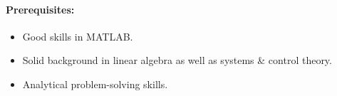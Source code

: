 \documentclass[a4paper, 12pt, english]{article}
\begin{document}
	\paragraph{Prerequisites:}
	\begin{itemize}
		\item Good skills in MATLAB.
		\item Solid background in linear algebra as well as systems \& control theory.
		\item Analytical problem-solving skills.
	\end{itemize}
	
\end{document}
